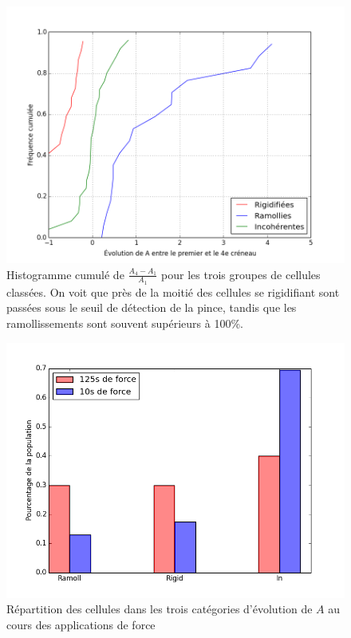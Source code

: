 \begin{figure}
\includegraphics[scale=0.5]{Figures/Evolution_J4-J0_sur_J0.png} 
\caption{Histogramme cumulé de $\frac{A_4-A_1}{A_1}$ pour les trois groupes de cellules classées. On voit que près de la moitié des cellules se rigidifiant sont passées sous le seuil de détection de la pince, tandis que les ramollissements sont souvent supérieurs à 100\%.  }
\end{figure}

\begin{figure}
\includegraphics[scale=0.5]{Figures/FRI_temoin_vs_C4.png} 
\caption{Répartition des cellules dans les trois catégories d'évolution de $A$ au cours des applications de force \label{FRI_temoin}}
\end{figure}


